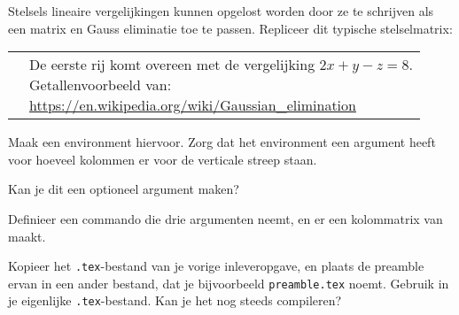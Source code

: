 \documentclass[a4paper]{article}
\begin{document}
\begin{exercise}
Stelsels lineaire vergelijkingen kunnen opgelost worden door ze te schrijven als een matrix en Gauss
eliminatie toe te passen.
Repliceer dit typische stelselmatrix:

\begin{tabularx}{\textwidth}{Xp{}}
\adjustbox{valign=t}{\small$\displaystyle
    \left(\begin{array}{rrr|r}
        2 & 1 & -1 & 8\\
        -3 & -1 & 2 & -11\\
        -2 & 1 & 2 & -3
    \end{array}\right)
$}&
\parbox[t]{0.65\textwidth}{\small De eerste rij komt overeen met de vergelijking $ 2x+y-z=8 $.\\
Getallenvoorbeeld van:\\\url{https://en.wikipedia.org/wiki/Gaussian_elimination}}
\end{tabularx}

Maak een environment hiervoor. Zorg dat het environment een argument heeft voor hoeveel
kolommen er voor de verticale streep staan.

Kan je dit een optioneel argument maken?
\end{exercise}

\begin{exercise}[Vector]
    Definieer een commando die drie argumenten neemt, en er een kolommatrix van maakt.
\end{exercise}

\begin{exercise}
    Kopieer het \texttt{.tex}-bestand van je vorige inleveropgave, en plaats de preamble ervan
    in een ander bestand, dat je bijvoorbeeld \texttt{preamble.tex} noemt. Gebruik
    \texttt{} in je eigenlijke \texttt{.tex}-bestand.
    Kan je het nog steeds compileren?
\end{exercise}

\end{document}
